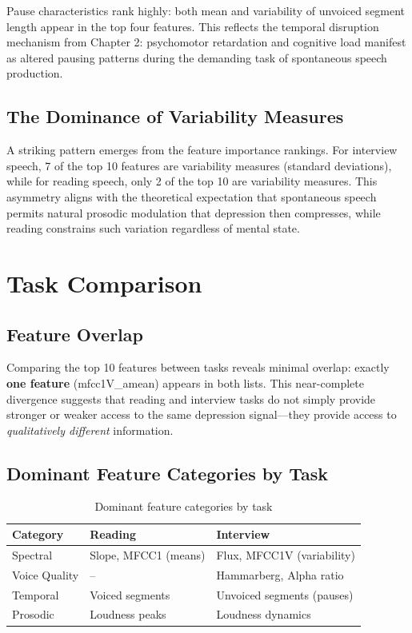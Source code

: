Pause characteristics rank highly: both mean and variability of unvoiced segment length appear in the top four features. This reflects the temporal disruption mechanism from Chapter 2: psychomotor retardation and cognitive load manifest as altered pausing patterns during the demanding task of spontaneous speech production.

\subsection{The Dominance of Variability Measures}

A striking pattern emerges from the feature importance rankings. For interview speech, 7 of the top 10 features are variability measures (standard deviations), while for reading speech, only 2 of the top 10 are variability measures. This asymmetry aligns with the theoretical expectation that spontaneous speech permits natural prosodic modulation that depression then compresses, while reading constrains such variation regardless of mental state.

\section{Task Comparison}

\subsection{Feature Overlap}

Comparing the top 10 features between tasks reveals minimal overlap: exactly \textbf{one feature} (mfcc1V\_amean) appears in both lists. This near-complete divergence suggests that reading and interview tasks do not simply provide stronger or weaker access to the same depression signal---they provide access to \textit{qualitatively different} information.

\subsection{Dominant Feature Categories by Task}

\begin{table}[h]
\centering
\caption{Dominant feature categories by task}
\label{tab:feature-categories-comparison}
\begin{tabular}{lll}
\hline
\textbf{Category} & \textbf{Reading} & \textbf{Interview} \\
\hline
Spectral & Slope, MFCC1 (means) & Flux, MFCC1V (variability) \\
Voice Quality & -- & Hammarberg, Alpha ratio \\
Temporal & Voiced segments & Unvoiced segments (pauses) \\
Prosodic & Loudness peaks & Loudness dynamics \\
\hline
\end{tabular}
\end{table}

